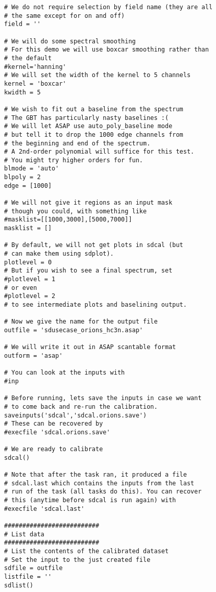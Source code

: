 \begin{verbatim}
# We do not require selection by field name (they are all
# the same except for on and off)
field = ''

# We will do some spectral smoothing
# For this demo we will use boxcar smoothing rather than
# the default
#kernel='hanning'
# We will set the width of the kernel to 5 channels
kernel = 'boxcar'
kwidth = 5

# We wish to fit out a baseline from the spectrum
# The GBT has particularly nasty baselines :(
# We will let ASAP use auto_poly_baseline mode
# but tell it to drop the 1000 edge channels from
# the beginning and end of the spectrum.
# A 2nd-order polynomial will suffice for this test.
# You might try higher orders for fun.
blmode = 'auto'
blpoly = 2
edge = [1000]

# We will not give it regions as an input mask
# though you could, with something like
#masklist=[[1000,3000],[5000,7000]]
masklist = []

# By default, we will not get plots in sdcal (but
# can make them using sdplot).
plotlevel = 0
# But if you wish to see a final spectrum, set
#plotlevel = 1
# or even
#plotlevel = 2
# to see intermediate plots and baselining output.

# Now we give the name for the output file
outfile = 'sdusecase_orions_hc3n.asap'

# We will write it out in ASAP scantable format
outform = 'asap'

# You can look at the inputs with
#inp

# Before running, lets save the inputs in case we want
# to come back and re-run the calibration.
saveinputs('sdcal','sdcal.orions.save')
# These can be recovered by
#execfile 'sdcal.orions.save'

# We are ready to calibrate
sdcal()

# Note that after the task ran, it produced a file
# sdcal.last which contains the inputs from the last
# run of the task (all tasks do this). You can recover
# this (anytime before sdcal is run again) with
#execfile 'sdcal.last'

##########################
# List data
##########################
# List the contents of the calibrated dataset
# Set the input to the just created file
sdfile = outfile
listfile = ''
sdlist()


\end{verbatim}
